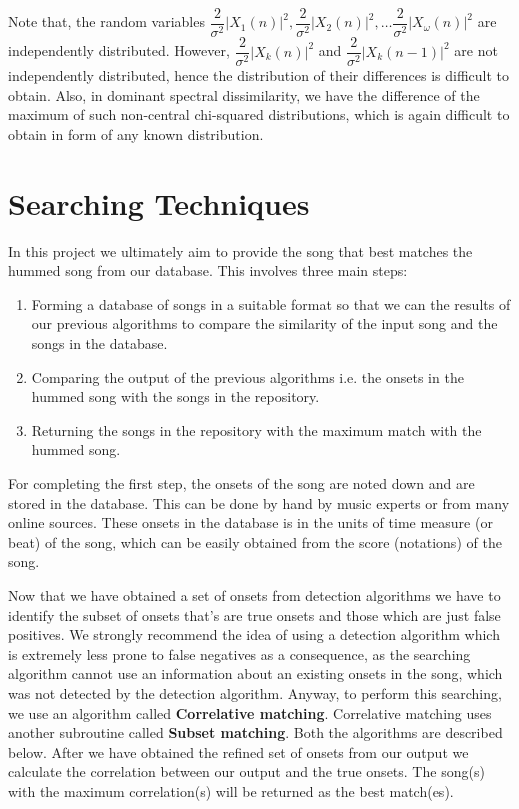 \documentclass[10pt]{article}
\begin{document}
Note that, the random variables $\dfrac{2}{\sigma^2}\vert X_1(n)\vert^2, \dfrac{2}{\sigma^2}\vert X_2(n)\vert^2, \dots \dfrac{2}{\sigma^2}\vert X_\omega(n)\vert^2$ are independently distributed. However, $\dfrac{2}{\sigma^2}\vert X_k(n)\vert^2$
and $\dfrac{2}{\sigma^2}\vert X_k(n-1)\vert^2$ are not independently distributed, hence the distribution of their differences is difficult to obtain. Also, in dominant spectral dissimilarity, we have the difference of the maximum of such non-central chi-squared distributions, which is again difficult to obtain in form of any known distribution. 





\section{Searching Techniques}

\qquad In this project we ultimately aim to provide the song that best matches the hummed song from our database. This involves three main steps:
\begin{enumerate}
    \item Forming a database of songs in a suitable format so that we can the results of our previous algorithms to compare the similarity of the input song and the songs in the database.
    \item Comparing the output of the previous algorithms i.e. the onsets in the hummed song with the songs in the repository.
    \item Returning the songs in the repository with the maximum match with the hummed song.
\end{enumerate}

For completing the first step, the onsets of the song are noted down and are stored in the database. This can be done by hand by music experts or from many online sources. These onsets in the database is in the units of time measure (or beat) of the song, which can be easily obtained from the score (notations) of the song.

Now that we have obtained a set of onsets from detection algorithms we have to identify the subset of onsets that’s are true onsets and those which are just false positives. We strongly recommend the idea of using a detection algorithm which is extremely less prone to false negatives as a consequence, as the searching algorithm cannot use an information about an existing onsets in the song, which was not detected by the detection algorithm. Anyway, to perform this searching, we use an algorithm called \textbf{Correlative matching}. Correlative matching uses another subroutine called \textbf{Subset matching}. Both the algorithms are described below. After we have obtained the refined set of onsets from our output we calculate the correlation between our output and the true onsets. The song(s) with the maximum correlation(s) will be returned as the best match(es).
\end{document}

